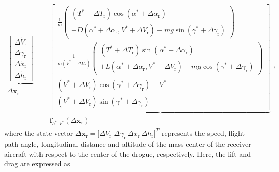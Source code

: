 \begin{equation}
\begin{array}{c}
\underbrace{\left[
	\begin{array}{c}
	\Delta \dot{V}_\text{r}  \\
	\Delta \dot{\gamma}_\text{r} \\
	\Delta \dot{x}_\text{r} \\
	\Delta \dot{h}_\text{r}%
	\end{array}
	\right] } \\
\Delta \mathbf{\dot{x}}_\text{r}%
\end{array}
=%
\begin{array}{c}
\underbrace{\left[
	\begin{array}{c}
	\frac{1}{m}\left(
	\begin{array}{c}
	\left( T ^{*}+\Delta T_\text{r}\right) \cos \left( \alpha ^{*}+\Delta \alpha
	_\text{r}\right) \\
	-D\left( \alpha ^{*}+\Delta \alpha_\text{r},V ^{*}+\Delta V_\text{r}\right) -mg\sin
	\left( \gamma ^{*}+\Delta \gamma_\text{r}\right)%
	\end{array}
	\right) \\
	\frac{1}{m\left( V ^{*}+\Delta V_\text{r}\right) }\left(
	\begin{array}{c}
	\left( T ^{*}+\Delta T_\text{r}\right) \sin \left( \alpha ^{*}+\Delta \alpha
	_\text{r}\right) \\
	+L\left( \alpha ^{*}+\Delta \alpha_\text{r},V ^{*}+\Delta V_\text{r}\right) -mg\cos
	\left( \gamma ^{*}+\Delta \gamma_\text{r}\right)%
	\end{array}
	\right) \\
	\left( V ^{*}+\Delta V_\text{r}\right) \cos \left( \gamma ^{*}+\Delta \gamma
	_\text{r}\right) -V ^{*} \\
	\left( V ^{*}+\Delta V_\text{r}\right) \sin \left( \gamma ^{*}+\Delta \gamma
	_\text{r}\right)%
	\end{array}
	\right] } \\
\mathbf{f}_{h ^{*},V ^{*}}(\Delta \mathbf{x}_\text{r})%
\end{array}
\text{,}  \label{1}
\end{equation}
where the state vector $\Delta \mathbf{x}_\text{r}=[\Delta V_\text{r}$ $\Delta \gamma
_\text{r}\ \Delta x_\text{r}\ \Delta h_\text{r}]^{T}$ represents the speed, flight path
angle, longitudinal distance and altitude of the mass center of the receiver
aircraft with respect to the center of the drogue, respectively. Here, the
lift and drag are expressed as \cite{23}%

